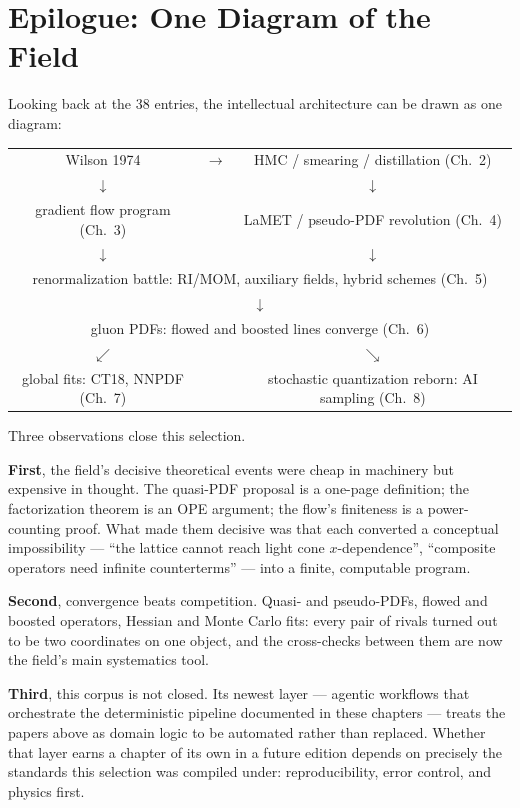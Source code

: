 \chapter*{Epilogue: One Diagram of the Field}


Looking back at the 38 entries, the intellectual architecture can be
drawn as one diagram:

\begin{center}
\begin{tabular}{ccc}
Wilson 1974 & $\longrightarrow$ & HMC / smearing / distillation (Ch.~2)\\[2pt]
$\downarrow$ & & $\downarrow$\\[2pt]
gradient flow program (Ch.~3) & & LaMET / pseudo-PDF revolution (Ch.~4)\\[2pt]
$\downarrow$ & & $\downarrow$\\
\multicolumn{3}{c}{renormalization battle: RI/MOM, auxiliary fields,
hybrid schemes (Ch.~5)}\\[-1pt]
\multicolumn{3}{c}{$\downarrow$}\\[-1pt]
\multicolumn{3}{c}{gluon PDFs: flowed and boosted lines converge (Ch.~6)}\\[2pt]
$\swarrow$ & & $\searrow$\\[2pt]
global fits: CT18, NNPDF (Ch.~7) & & stochastic quantization reborn:
AI sampling (Ch.~8)
\end{tabular}
\end{center}

Three observations close this selection.

\textbf{First}, the field's decisive theoretical events were cheap in
machinery but expensive in thought. The quasi-PDF proposal is a one-page
definition; the factorization theorem is an OPE argument; the flow's
finiteness is a power-counting proof. What made them decisive was that
each converted a conceptual impossibility --- ``the lattice cannot reach
light cone $x$-dependence'', ``composite operators need infinite
counterterms'' --- into a finite, computable program.

\textbf{Second}, convergence beats competition. Quasi- and pseudo-PDFs,
flowed and boosted operators, Hessian and Monte Carlo fits: every pair of
rivals turned out to be two coordinates on one object, and the
cross-checks between them are now the field's main systematics tool.

\textbf{Third}, this corpus is not closed. Its newest layer ---
agentic workflows that orchestrate the deterministic pipeline documented
in these chapters --- treats the papers above as domain logic to be
automated rather than replaced. Whether that layer earns a chapter of its
own in a future edition depends on precisely the standards this selection
was compiled under: reproducibility, error control, and physics first.
